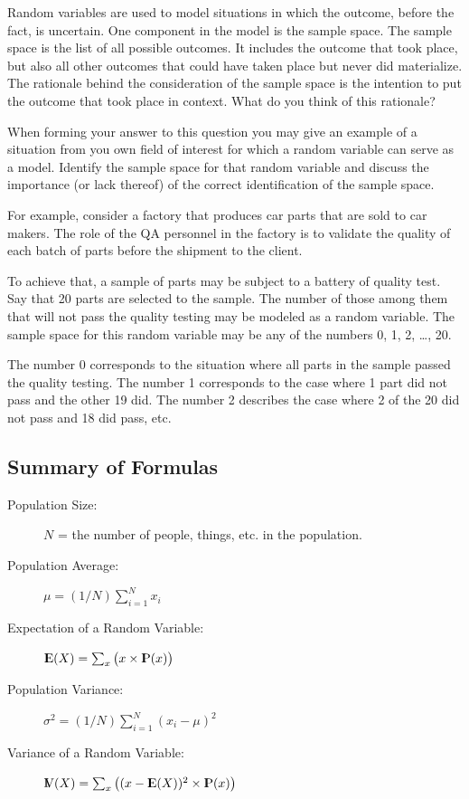 \documentclass[]{krantz}
\newcommand{\Expec}{{\rm I\kern-.3em E}}
\newcommand{\Prob}{{\rm I\kern-.3em P}}
\newcommand{\Var}{{\rm I\kern-.3em V}}
\theoremstyle{definition}
\theoremstyle{definition}
\theoremstyle{definition}
\theoremstyle{remark}
\begin{document}
Random variables are used to model situations in which the outcome,
before the fact, is uncertain. One component in the model is the sample
space. The sample space is the list of all possible outcomes. It
includes the outcome that took place, but also all other outcomes that
could have taken place but never did materialize. The rationale behind
the consideration of the sample space is the intention to put the
outcome that took place in context. What do you think of this rationale?

When forming your answer to this question you may give an example of a
situation from you own field of interest for which a random variable can
serve as a model. Identify the sample space for that random variable and
discuss the importance (or lack thereof) of the correct identification
of the sample space.

For example, consider a factory that produces car parts that are sold to
car makers. The role of the QA personnel in the factory is to validate
the quality of each batch of parts before the shipment to the client.

To achieve that, a sample of parts may be subject to a battery of
quality test. Say that 20 parts are selected to the sample. The number
of those among them that will not pass the quality testing may be
modeled as a random variable. The sample space for this random variable
may be any of the numbers 0, 1, 2, \ldots{}, 20.

The number 0 corresponds to the situation where all parts in the sample
passed the quality testing. The number 1 corresponds to the case where 1
part did not pass and the other 19 did. The number 2 describes the case
where 2 of the 20 did not pass and 18 did pass, etc.

\subsection*{Summary of Formulas}\label{summary-of-formulas}


\begin{description}
\item[Population Size:]
\(N\) = the number of people, things, etc. in the population.
\item[Population Average:]
\(\mu = (1/N)\sum_{i=1}^N x_i\)
\item[Expectation of a Random Variable:]
\(\Expec(X) = \sum_x \big(x \times \Prob(x)\big)\)
\item[Population Variance:]
\(\sigma^2 = (1/N)\sum_{i=1}^N (x_i-\mu)^2\)
\item[Variance of a Random Variable:]
\(\Var(X) = \sum_x\big( (x-\Expec(X))^2 \times \Prob(x)\big)\)
\end{description}
\end{document}
